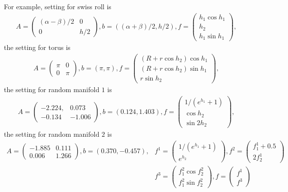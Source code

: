 For example, setting for swiss roll is 
\begin{align}
    A = \begin{pmatrix}
        (\alpha - \beta)/2 & 0 \\
        0 & h/2 
    \end{pmatrix}, b = \left((\alpha+\beta)/2, h/2 \right), f = \begin{pmatrix}
        h_1 \cos h_1\\ h_2 \\ h_1 \sin h_1
    \end{pmatrix},
\end{align}
the setting for torus is 
\begin{align}
    A = \begin{pmatrix}
        \pi & 0 \\
        0 & \pi 
    \end{pmatrix}, b = \left(\pi, \pi \right), f = \begin{pmatrix}
        (R + r \cos h_2) \cos h_1 \\
        (R + r \cos h_2) \sin h_1 \\
        r \sin h_2
    \end{pmatrix},
\end{align}
the setting for random manifold $1$ is 
\begin{align}
    A = \begin{pmatrix}
            -2.224, & 0.073 \\
            -0.134 & -1.006
    \end{pmatrix}, b = \left(0.124 , 1.403 \right), f = \begin{pmatrix}
        1/(e^{h_1}+1) \\
        \cos h_2 \\
        \sin 2h_2
    \end{pmatrix},
\end{align}
the setting for random manifold $2$ is 
\begin{align}
    A = \begin{pmatrix}
            -1.885 & 0.111 \\
            0.006 & 1.266
    \end{pmatrix}, b = \left(0.370 , -0.457 \right), 
    &f^1 = \begin{pmatrix}
        1/(e^{h_1}+1) \\
        e^{h_2}
    \end{pmatrix}, f^2 = \begin{pmatrix}
        f^1_1 + 0.5 \\
        2 f^1_2
    \end{pmatrix} \\

    &f^3 = \begin{pmatrix}
        f^2_1 \cos f^2_2 \\
        f^2_1 \sin f^2_2
    \end{pmatrix}, f = \begin{pmatrix}
        f^1 \\
        f^3
    \end{pmatrix}
\end{align}

